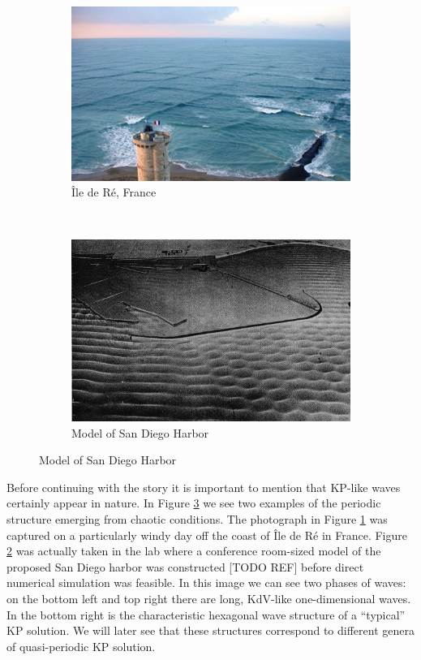 \begin{figure}
  \centering
  \begin{subfigure}[b]{0.4\textwidth}
    \includegraphics[width=\textwidth]{images/livekp.jpg}
    \caption{\^{I}le de R\'{e}, France}
    \label{fig:ile-de-re}
  \end{subfigure}
  ~
  \begin{subfigure}[b]{0.4\textwidth}
    \centering
    \includegraphics[width=\textwidth]{images/sd-harbor-model.jpg}
    \caption{Model of San Diego Harbor}
    \label{fig:san-diego-harbor}
  \end{subfigure}
  \label{fig:real-life}
\end{figure}

Before continuing with the story it is important to mention that KP-like waves
certainly appear in nature. In Figure \ref{fig:real-life} we see two examples of
the periodic structure emerging from chaotic conditions. The photograph in
Figure \ref{fig:ile-de-re} was captured on a particularly windy day off the
coast of \^{I}le de R\'{e} in France. Figure \ref{fig:san-diego-harbor} was
actually taken in the lab where a conference room-sized model of the proposed
San Diego harbor was constructed [TODO REF] before direct numerical simulation
was feasible. In this image we can see two phases of waves: on the bottom left
and top right there are long, KdV-like one-dimensional waves. In the bottom
right is the characteristic hexagonal wave structure of a ``typical'' KP
solution. We will later see that these structures correspond to different genera
of quasi-periodic KP solution.

